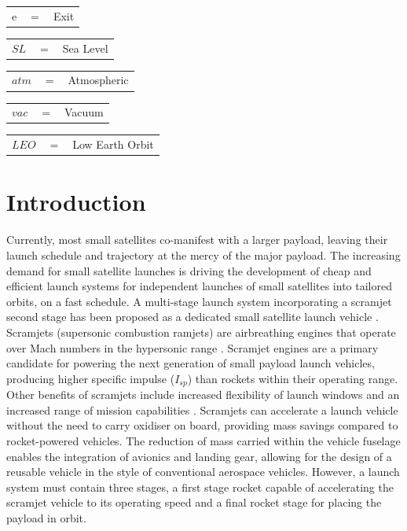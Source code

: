 \documentclass[]{aiaa-tc}
\begin{document}
\begin{tabular}{p{1.2cm}p{1cm}p{5cm}}
	e & $=$ & Exit\\
\end{tabular} 
\begin{tabular}{p{1.2cm}p{1cm}p{5cm}}
	$SL$ & $=$ & Sea Level\\
\end{tabular} 
\begin{tabular}{p{1.2cm}p{1cm}p{5cm}}
	$atm$ & $=$ & Atmospheric\\
	
\end{tabular} 
\begin{tabular}{p{1.2cm}p{1cm}p{5cm}}
	$vac$ & $=$ & Vacuum\\
	
\end{tabular} 
\begin{tabular}{p{1.2cm}p{1cm}p{5cm}}
	$LEO$ & $=$ & Low Earth Orbit\\
	
\end{tabular} 
\newpage
\section{Introduction}






Currently, most small satellites co-manifest with a larger payload, leaving their launch schedule and trajectory at the mercy of the major payload. The  increasing demand for small satellite launches\cite{Faa&Ast&Comstac2015} is driving the development of cheap and efficient launch systems for independent launches of small satellites into tailored orbits, on a fast schedule. 
A multi-stage launch system incorporating a scramjet second stage has been proposed as a dedicated small satellite launch vehicle \cite{Smart2009a}. 
Scramjets (supersonic combustion ramjets) are airbreathing engines that operate over Mach numbers in the hypersonic  range \cite{HeiserWilliamPratt1994}. 
Scramjet engines are a primary candidate for powering the next generation of small payload launch vehicles, producing higher specific impulse ($I_{sp}$)  than rockets within their operating range. Other benefits of scramjets include increased flexibility of launch windows and an increased range of mission capabilities \cite{Flaherty2010}. 
Scramjets can accelerate a launch vehicle without the need to carry oxidiser on board, providing mass savings compared to rocket-powered vehicles. 
 The reduction of mass carried within the vehicle fuselage enables the integration of avionics and landing gear, allowing for the design of a reusable vehicle in the style of conventional aerospace vehicles. 
However, a launch system must contain three stages, a first stage rocket capable of accelerating the scramjet vehicle to its operating speed and a final rocket stage for placing the payload in orbit. 
\end{document}
